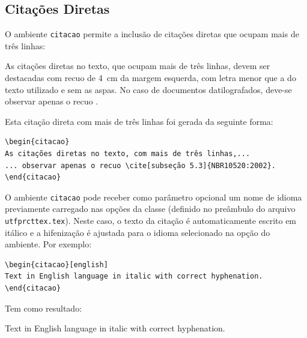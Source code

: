 \subsection{Citações Diretas}\label{sec:citacoesdiretas}

O ambiente \texttt{citacao} permite a inclusão de citações diretas que ocupam mais de três linhas:

\begin{citacao}%
As citações diretas no texto, que ocupam mais de três linhas, devem ser destacadas com recuo de \SI{4}{cm} da margem esquerda, com letra menor que a do texto utilizado e sem as aspas. No caso de documentos datilografados, deve-se observar apenas o recuo \cite[subseção 5.3]{NBR10520:2002}.
\end{citacao}

\noindent Esta citação direta com mais de três linhas foi gerada da seguinte forma:

\begin{SingleSpacing}%
\begin{verbatim}
\begin{citacao}
As citações diretas no texto, com mais de três linhas,...
... observar apenas o recuo \cite[subseção 5.3]{NBR10520:2002}.
\end{citacao}
\end{verbatim}
\end{SingleSpacing}

O ambiente \texttt{citacao} pode receber como parâmetro opcional um nome de idioma previamente carregado nas opções da classe (definido no preâmbulo do arquivo \texttt{utfprcttex.tex}). Neste caso, o texto da citação é automaticamente escrito em itálico e a hifenização é ajustada para o idioma selecionado na opção do ambiente. Por exemplo:

\begin{SingleSpacing}%
\begin{verbatim}
\begin{citacao}[english]
Text in English language in italic with correct hyphenation.
\end{citacao}
\end{verbatim}
\end{SingleSpacing}

\noindent Tem como resultado:

\begin{citacao}[english]%
Text in English language in italic with correct hyphenation.
\end{citacao}

